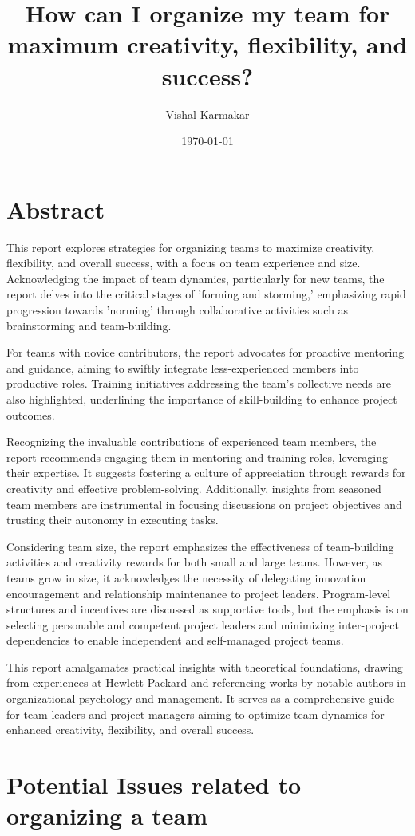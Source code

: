 \documentclass[a4paper, twoside]{article}
\date{\monthyeardate\today}
\author{Vishal  Karmakar}
\title{How can I organize my team
for maximum creativity, flexibility,
and success?}
\begin{document}


\section{Abstract}
This report explores strategies for organizing teams to maximize creativity, flexibility, and overall success, with a focus on team experience and size. Acknowledging the impact of team dynamics, particularly for new teams, the report delves into the critical stages of 'forming and storming,' emphasizing rapid progression towards 'norming' through collaborative activities such as brainstorming and team-building.

For teams with novice contributors, the report advocates for proactive mentoring and guidance, aiming to swiftly integrate less-experienced members into productive roles. Training initiatives addressing the team's collective needs are also highlighted, underlining the importance of skill-building to enhance project outcomes.

Recognizing the invaluable contributions of experienced team members, the report recommends engaging them in mentoring and training roles, leveraging their expertise. It suggests fostering a culture of appreciation through rewards for creativity and effective problem-solving. Additionally, insights from seasoned team members are instrumental in focusing discussions on project objectives and trusting their autonomy in executing tasks.

Considering team size, the report emphasizes the effectiveness of team-building activities and creativity rewards for both small and large teams. However, as teams grow in size, it acknowledges the necessity of delegating innovation encouragement and relationship maintenance to project leaders. Program-level structures and incentives are discussed as supportive tools, but the emphasis is on selecting personable and competent project leaders and minimizing inter-project dependencies to enable independent and self-managed project teams.

This report amalgamates practical insights with theoretical foundations, drawing from experiences at Hewlett-Packard and referencing works by notable authors in organizational psychology and management. It serves as a comprehensive guide for team leaders and project managers aiming to optimize team dynamics for enhanced creativity, flexibility, and overall success.

\section{Potential Issues related to organizing a team}
\end{document}
